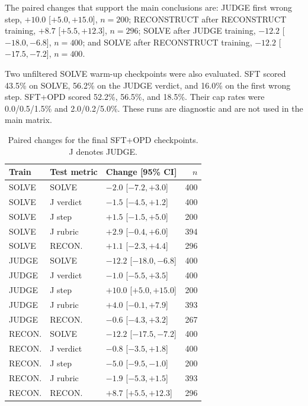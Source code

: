 \documentclass[11pt]{article}
\begin{document}
The paired changes that support the main conclusions are: JUDGE first wrong step, $+10.0$ [$+5.0,+15.0$], $n=200$; RECONSTRUCT after RECONSTRUCT training, $+8.7$ [$+5.5,+12.3$], $n=296$; SOLVE after JUDGE training, $-12.2$ [$-18.0,-6.8$], $n=400$; and SOLVE after RECONSTRUCT training, $-12.2$ [$-17.5,-7.2$], $n=400$.

Two unfiltered SOLVE warm-up checkpoints were also evaluated. SFT scored 43.5\% on SOLVE, 56.2\% on the JUDGE verdict, and 16.0\% on the first wrong step. SFT+OPD scored 52.2\%, 56.5\%, and 18.5\%. Their cap rates were 0.0/0.5/1.5\% and 2.0/0.2/5.0\%. These runs are diagnostic and are not used in the main matrix.

\begin{table}[h]
\centering
\footnotesize
\setlength{\tabcolsep}{2.4pt}
\begin{tabular}{lllr}
\toprule
Train & Test metric & Change [95\% CI] & $n$ \\
\midrule
SOLVE & SOLVE & $-2.0$ [$-7.2,+3.0$] & 400 \\
SOLVE & J verdict & $-1.5$ [$-4.5,+1.2$] & 400 \\
SOLVE & J step & $+1.5$ [$-1.5,+5.0$] & 200 \\
SOLVE & J rubric & $+2.9$ [$-0.4,+6.0$] & 394 \\
SOLVE & RECON. & $+1.1$ [$-2.3,+4.4$] & 296 \\
\midrule
JUDGE & SOLVE & $-12.2$ [$-18.0,-6.8$] & 400 \\
JUDGE & J verdict & $-1.0$ [$-5.5,+3.5$] & 400 \\
JUDGE & J step & $+10.0$ [$+5.0,+15.0$] & 200 \\
JUDGE & J rubric & $+4.0$ [$-0.1,+7.9$] & 393 \\
JUDGE & RECON. & $-0.6$ [$-4.3,+3.2$] & 267 \\
\midrule
RECON. & SOLVE & $-12.2$ [$-17.5,-7.2$] & 400 \\
RECON. & J verdict & $-0.8$ [$-3.5,+1.8$] & 400 \\
RECON. & J step & $-5.0$ [$-9.5,-1.0$] & 200 \\
RECON. & J rubric & $-1.9$ [$-5.3,+1.5$] & 393 \\
RECON. & RECON. & $+8.7$ [$+5.5,+12.3$] & 296 \\
\bottomrule
\end{tabular}
\caption{Paired changes for the final SFT+OPD checkpoints. J denotes JUDGE.}
\label{tab:transfer-final-full}
\end{table}
\end{document}
